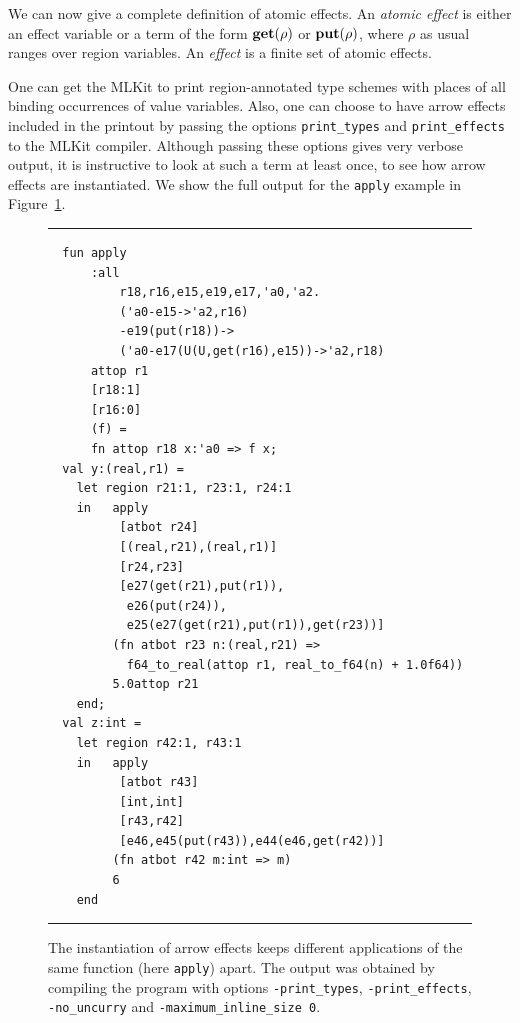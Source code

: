 \documentclass[12pt]{book}
\begin{document}
We can now give a complete definition of atomic effects.  An
%
{\em atomic effect\/} is either an effect variable or a term of the
form $\mathop{\bf get}\nolimits(\rho)$ or $\mathop{\bf put}\nolimits(\rho)$, where $\rho$ as usual ranges over
region variables. An
%
{\em effect\/} is a finite set of atomic effects.

One can get the MLKit to print region-annotated
%
%
type schemes with places of all binding occurrences of value
variables.  Also, one can choose to have arrow effects included in the
printout by passing the options \texttt{print\_types} and
\texttt{print\_effects} to the MLKit compiler. Although passing these
options gives very verbose output, it is instructive to look at such a
term at least once, to see how arrow effects are instantiated. We show
the full output for the {\tt apply} example in Figure~\ref{apply.fig}.

\begin{figure}
\hrule \medskip
\begin{verbatim}
  fun apply
      :all
          r18,r16,e15,e19,e17,'a0,'a2.
          ('a0-e15->'a2,r16)
          -e19(put(r18))->
          ('a0-e17(U(U,get(r16),e15))->'a2,r18)
      attop r1
      [r18:1]
      [r16:0]
      (f) =
      fn attop r18 x:'a0 => f x;
  val y:(real,r1) =
    let region r21:1, r23:1, r24:1
    in   apply
          [atbot r24]
          [(real,r21),(real,r1)]
          [r24,r23]
          [e27(get(r21),put(r1)),
           e26(put(r24)),
           e25(e27(get(r21),put(r1)),get(r23))]
         (fn atbot r23 n:(real,r21) =>
           f64_to_real(attop r1, real_to_f64(n) + 1.0f64))
         5.0attop r21
    end;
  val z:int =
    let region r42:1, r43:1
    in   apply
          [atbot r43]
          [int,int]
          [r43,r42]
          [e46,e45(put(r43)),e44(e46,get(r42))]
         (fn atbot r42 m:int => m)
         6
    end
\end{verbatim}
\caption{The instantiation of arrow effects keeps different applications of
  the same function (here {\tt apply}) apart. The output was obtained
  by compiling the program  with options
  \texttt{-print\_types}, \texttt{-print\_effects}, \texttt{-no\_uncurry} and
  \texttt{-maximum\_inline\_size 0}.}  \medskip \hrule
\label{apply.fig}
\end{figure}
\end{document}
